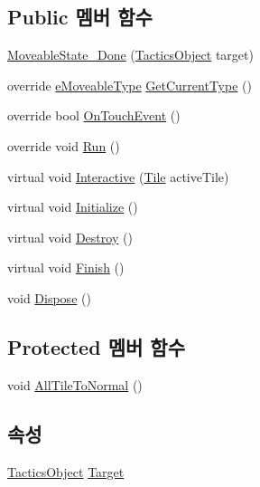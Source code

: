 \subsection*{Public 멤버 함수}
\begin{DoxyCompactItemize}
\item 
\hyperlink{class_move_decorator_1_1_moveable_state___done_a0638eb5d7515819aaa41dbaa70dd82e7}{Moveable\+State\+\_\+\+Done} (\hyperlink{class_tactics_object}{Tactics\+Object} target)
\item 
override \hyperlink{_move_decorator_8cs_a90215797ba850e199f3ef63d7c56f132}{e\+Moveable\+Type} \hyperlink{class_move_decorator_1_1_moveable_state___done_acc33dcadba0272ede2c801abe30a008c}{Get\+Current\+Type} ()
\item 
override bool \hyperlink{class_move_decorator_1_1_moveable_state___done_a650337320d3012ec1a8b1fd5a2d4afa5}{On\+Touch\+Event} ()
\item 
override void \hyperlink{class_move_decorator_1_1_moveable_state___done_ad6aac25a9f42d14a958d1c93e3b6bd79}{Run} ()
\item 
virtual void \hyperlink{class_move_decorator_1_1_moveable_state_a1e66885aa7daf1021fc654b706b53ab8}{Interactive} (\hyperlink{class_tile}{Tile} active\+Tile)
\item 
virtual void \hyperlink{class_m_c_n_1_1_state_a5be59bc891e64cbbe4322d74a6746908}{Initialize} ()
\item 
virtual void \hyperlink{class_m_c_n_1_1_state_aebf48ef248bbf185d6aae91d9789459e}{Destroy} ()
\item 
virtual void \hyperlink{class_m_c_n_1_1_state_a2492ca731678b8216c02134dddeeb745}{Finish} ()
\item 
void \hyperlink{class_m_c_n_1_1_state_af6df0477e0dead784489688cb2c2093e}{Dispose} ()
\end{DoxyCompactItemize}
\subsection*{Protected 멤버 함수}
\begin{DoxyCompactItemize}
\item 
void \hyperlink{class_move_decorator_1_1_moveable_state_a2b63f058084f2548f8547c21715d271c}{All\+Tile\+To\+Normal} ()
\end{DoxyCompactItemize}
\subsection*{속성}
\begin{DoxyCompactItemize}
\item 
\hyperlink{class_tactics_object}{Tactics\+Object} \hyperlink{class_m_c_n_1_1_state_a79a563b32f183c9adc9a96679fc57eb8}{Target}
\end{DoxyCompactItemize}


